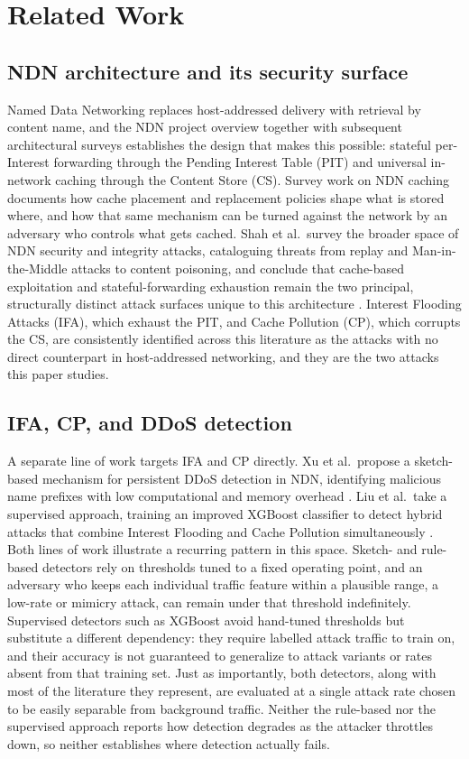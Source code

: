 \section{Related Work}
\label{sec:related}

\subsection{NDN architecture and its security surface}
Named Data Networking replaces host-addressed delivery with retrieval by content name, and the NDN project overview \cite{zhang2010ndn} together with subsequent architectural surveys \cite{jaffri2013ndn} establishes the design that makes this possible: stateful per-Interest forwarding through the Pending Interest Table (PIT) and universal in-network caching through the Content Store (CS). Survey work on NDN caching \cite{caching_survey} documents how cache placement and replacement policies shape what is stored where, and how that same mechanism can be turned against the network by an adversary who controls what gets cached. Shah et al.\ survey the broader space of NDN security and integrity attacks, cataloguing threats from replay and Man-in-the-Middle attacks to content poisoning, and conclude that cache-based exploitation and stateful-forwarding exhaustion remain the two principal, structurally distinct attack surfaces unique to this architecture \cite{shah2023security}. Interest Flooding Attacks (IFA), which exhaust the PIT, and Cache Pollution (CP), which corrupts the CS, are consistently identified across this literature as the attacks with no direct counterpart in host-addressed networking, and they are the two attacks this paper studies.

\subsection{IFA, CP, and DDoS detection}
A separate line of work targets IFA and CP directly. Xu et al.\ propose a sketch-based mechanism for persistent DDoS detection in NDN, identifying malicious name prefixes with low computational and memory overhead \cite{xu_persistent_detection}. Liu et al.\ take a supervised approach, training an improved XGBoost classifier to detect hybrid attacks that combine Interest Flooding and Cache Pollution simultaneously \cite{liu2025xgboost}. Both lines of work illustrate a recurring pattern in this space. Sketch- and rule-based detectors rely on thresholds tuned to a fixed operating point, and an adversary who keeps each individual traffic feature within a plausible range, a low-rate or mimicry attack, can remain under that threshold indefinitely. Supervised detectors such as XGBoost avoid hand-tuned thresholds but substitute a different dependency: they require labelled attack traffic to train on, and their accuracy is not guaranteed to generalize to attack variants or rates absent from that training set. Just as importantly, both detectors, along with most of the literature they represent, are evaluated at a single attack rate chosen to be easily separable from background traffic. Neither the rule-based nor the supervised approach reports how detection degrades as the attacker throttles down, so neither establishes where detection actually fails.

